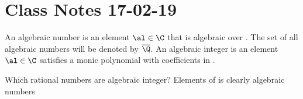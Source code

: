 \section{Class Notes 17-02-19}
\begin{definition}
An algebraic number is an element $\al\in\C$ that is algebraic over \Q. The set of all algebraic numbers will be denoted by $\overline{\Q}$. An algebraic integer is an element $\al\in\C$ satisfies a monic polynomial with coefficients in \Z.
\end{definition}
\begin{exercise}
Which rational numbers are algebraic integer? Elements of \Z is clearly algebraic numbers
\end{exercise}